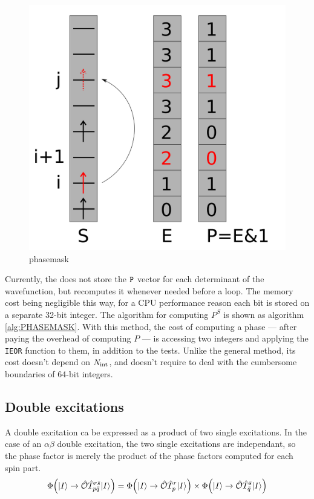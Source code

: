 \documentclass[./thesis.tex]{subfiles}
\begin{document}
                
\begin{figure}[h!]
	\begin{center}
		\includegraphics[width=0.6\columnwidth]{figures/determinant_driven/phase}
		\caption{
		\label{generators_selectors}
		phasemask
		}
	\end{center}
\end{figure}


Currently, the \QP does not store the ${\texttt{P}}$ vector for each determinant of the wavefunction, but recomputes it whenever needed before a loop. The memory cost being negligible this way, for a CPU performance reason each bit is stored on a separate 32-bit integer.
The algorithm for computing $P^S$ is shown as algorithm \ref{alg:PHASEMASK}. 
With this method, the cost of computing a phase --- after paying the overhead of computing $P$ --- is accessing two integers and applying the \lstinline{IEOR} function to them, in addition to the tests. Unlike the general method, its cost doesn't depend on ${N_\text{int}}$, and doesn't require to deal with the cumbersome boundaries of 64-bit integers.



\subsection{Double excitations}


A double excitation ca be expressed as a product of two single excitations.
In the case of an $\alpha \beta$ double excitation, the two single excitations are independant, so the phase factor is merely the product of the phase factors computed for each spin part. 
\begin{equation}
{\Phi \qty({\ket{I}}\rightarrow {\hat{\mathcal{O}}}{\hat{T}_{p \bar q}^{r \bar s}} {\ket{I}})} = 
{\Phi \qty({\ket{I}} \rightarrow {\hat{\mathcal{O}}} {\hat{T}_{p}^{r}} {\ket{I}})} \times
{\Phi \qty({\ket{I}}\rightarrow {\hat{\mathcal{O}}}{\hat{T}_{\bar q}^{\bar s}} {\ket{I}})} 
\end{equation}
\end{document}
